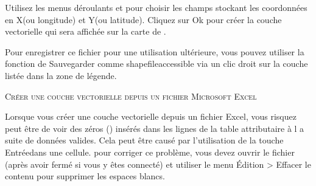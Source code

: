 
Utilisez les menus déroulants  et  pour choisir les champs stockant les coordonnées en \og X\fg  (ou longitude) et \og Y\fg  (ou latitude). Cliquez sur Ok pour créer la couche vectorielle qui sera affichée sur la carte de \qg.


Pour enregistrer ce fichier pour une utilisation ultérieure, vous pouvez utiliser la fonction de \qg \og Sauvegarder comme shapefile\fg  accessible via un clic droit sur la couche listée dans la zone de légende.


\begin{Tip}\caption{\textsc{Créer une couche vectorielle depuis un fichier Microsoft Excel}}
Lorsque vous créer une couche vectorielle depuis un fichier Excel, vous risquez peut être de voir des zéros (\fg ) insérés dans les lignes de la table attributaire à l a suite de données valides. Cela peut être causé par l'utilisation de la touche \og Entrée\fg dans une cellule. pour corriger ce problème, vous devez ouvrir le fichier (après avoir fermé \qg si vous y êtes connecté) et utiliser le menu Édition > Effacer le contenu pour supprimer les espaces blancs.
\end{Tip}

